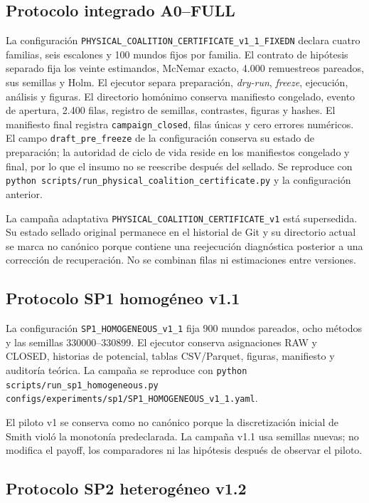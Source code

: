 \subsection*{Protocolo integrado A0--FULL}

La configuración \texttt{PHYSICAL\_COALITION\_CERTIFICATE\_v1\_1\_FIXEDN} declara cuatro familias, seis escalones y 100 mundos fijos por familia. El contrato de hipótesis separado fija los veinte estimandos, McNemar exacto, 4.000 remuestreos pareados, sus semillas y Holm. El ejecutor separa preparación, \emph{dry-run}, \emph{freeze}, ejecución, análisis y figuras. El directorio homónimo conserva manifiesto congelado, evento de apertura, 2.400 filas, registro de semillas, contrastes, figuras y hashes. El manifiesto final registra \texttt{campaign\_closed}, filas únicas y cero errores numéricos. El campo \texttt{draft\_pre\_freeze} de la configuración conserva su estado de preparación; la autoridad de ciclo de vida reside en los manifiestos congelado y final, por lo que el insumo no se reescribe después del sellado. Se reproduce con \texttt{python scripts/run\_physical\_coalition\_certificate.py} y la configuración anterior.

La campaña adaptativa \texttt{PHYSICAL\_COALITION\_CERTIFICATE\_v1} está supersedida. Su estado sellado original permanece en el historial de Git y su directorio actual se marca no canónico porque contiene una reejecución diagnóstica posterior a una corrección de recuperación. No se combinan filas ni estimaciones entre versiones.
\subsection*{Protocolo SP1 homogéneo v1.1}

La configuración \texttt{SP1\_HOMOGENEOUS\_v1\_1} fija 900 mundos pareados, ocho métodos y las semillas 330000--330899. El ejecutor conserva asignaciones RAW y CLOSED, historias de potencial, tablas CSV/Parquet, figuras, manifiesto y auditoría teórica. La campaña se reproduce con \texttt{python scripts/run\_sp1\_homogeneous.py configs/experiments/sp1/SP1\_HOMOGENEOUS\_v1\_1.yaml}.

El piloto v1 se conserva como no canónico porque la discretización inicial de Smith violó la monotonía predeclarada. La campaña v1.1 usa semillas nuevas; no modifica el payoff, los comparadores ni las hipótesis después de observar el piloto.

\subsection*{Protocolo SP2 heterogéneo v1.2}


